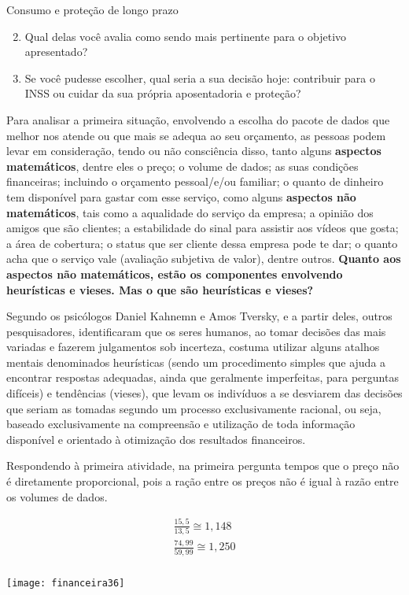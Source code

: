 \begin{task}{Consumo e proteção de longo prazo}
\begin{enumerate}\setcounter{enumi}{1}
  \item Qual delas você avalia como sendo mais pertinente para o objetivo apresentado?
  \item Se você pudesse escolher, qual seria a sua decisão hoje: contribuir para o INSS ou cuidar da sua própria aposentadoria e proteção?
\end{enumerate}
\end{task}


Para analisar a primeira situação, envolvendo a escolha do pacote de dados que melhor nos atende ou que mais se adequa ao seu orçamento, as pessoas podem levar em consideração, tendo ou não consciência disso, tanto alguns \textbf{aspectos matemáticos}, dentre eles o preço; o volume de dados; as suas condições financeiras; incluindo o orçamento pessoal/e/ou familiar; o quanto de dinheiro tem disponível para gastar com esse serviço, como alguns \textbf{aspectos não matemáticos}, tais como a aqualidade do serviço da empresa; a opinião dos amigos que são clientes; a estabilidade do sinal para assistir aos vídeos que gosta; a área de cobertura; o status que ser cliente dessa empresa pode te dar; o quanto acha que o serviço vale (avaliação subjetiva de valor), dentre outros. \textbf{Quanto aos aspectos não matemáticos, estão os componentes envolvendo heurísticas e vieses. Mas o que são heurísticas e vieses?}

Segundo os psicólogos Daniel Kahnemn e Amos Tversky, e a partir deles, outros pesquisadores, identificaram que os seres humanos, ao tomar decisões das mais variadas e fazerem julgamentos sob incerteza, costuma utilizar alguns atalhos mentais denominados heurísticas (sendo um procedimento simples que ajuda a encontrar respostas adequadas, ainda que geralmente imperfeitas, para perguntas difíceis) e tendências (vieses), que levam os indivíduos a se desviarem das decisões que seriam as tomadas segundo um processo exclusivamente racional, ou seja, baseado exclusivamente na compreensão e utilização de toda informação disponível e orientado à otimização dos resultados financeiros.

Respondendo à primeira atividade, na primeira pergunta tempos que o preço não é diretamente proporcional, pois a ração entre os preços não é igual à razão entre os volumes de dados.
\needspace{200bp}
\setlength{\columnsep}{-1cm}
\begin{multicols}{2}

\null\vfill
\begin{align*}
\frac{15{,}5}{13{,}5}\cong1{,}148\\
\frac{74{,}99}{59{,}99}\cong1{,}250\\
\end{align*}
\vfill\null

\flushleft

\texttt{[image: financeira36]}


\end{multicols}

